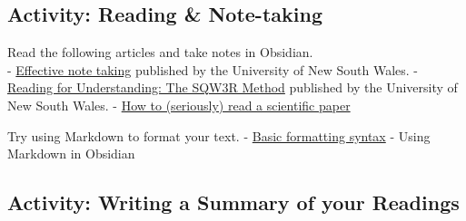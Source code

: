 \documentclass[
]{book}
\theoremstyle{definition}
\theoremstyle{definition}
\theoremstyle{definition}
\theoremstyle{definition}
\theoremstyle{remark}
\begin{document}
\hypertarget{activity-reading-note-taking}{%
\subsection*{Activity: Reading \& Note-taking}\label{activity-reading-note-taking}}

\begin{reflect}
Read the following articles and take notes in Obsidian.\\
- \href{https://www.student.unsw.edu.au/effective-reading-and-note-taking}{Effective note taking} published by the University of New South Wales.
- \href{https://www.student.unsw.edu.au/reading-understanding}{Reading for Understanding: The SQW3R Method} published by the University of New South Wales.
- \href{https://www.science.org/content/article/how-seriously-read-scientific-paper}{How to (seriously) read a scientific paper}

Try using Markdown to format your text.
- \href{https://help.obsidian.md/Editing+and+formatting/Basic+formatting+syntax}{Basic formatting syntax} - Using Markdown in Obsidian
\end{reflect}

\hypertarget{activity-writing-a-summary-of-your-readings}{%
\subsection*{Activity: Writing a Summary of your Readings}\label{activity-writing-a-summary-of-your-readings}}
\end{document}
